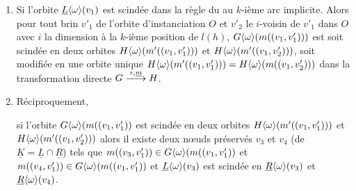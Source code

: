 \begin{proposition}
\begin{enumerate}
		\item Si l'orbite $\underline{L}\langle\omega\rangle(v_1)$ est scindée dans la règle du au $k$-ième arc implicite.
		      Alors pour tout brin $v'_1$ de l'orbite d'instanciation $O$ et $v'_2$ le $i$-voisin de $v'_1$ dans $O$ avec $i$ la dimension à la $k$-ième position de $l(h)$, $G\langle\omega\rangle(m((v_1,v'_1)))$ est soit scindée en deux orbites
		      $H\langle\omega\rangle(m'((v_1, v'_1)))$ et $H\langle\omega\rangle(m'((v_1,v'_2)))$, soit modifiée en une orbite unique $H\langle\omega\rangle(m'((v_1, v'_1))) = H\langle\omega\rangle(m((v_1,v'_2)))$ dans la transformation directe
		      $G \xlongrightarrow{r, \underline{m}} H$.

		\item Réciproquement,

		      si l'orbite $G\langle\omega\rangle(m((v_1, v'_1))$ est scindée en deux orbites
		      $H\langle\omega\rangle(m'((v_1, v'_1)))$ et $H\langle\omega\rangle(m'((v_1,v'_2)))$ alors il existe deux n\oe uds préservés $v_3$ et $v_4$ (de $\underline{K} = \underline{L} \cap \underline{R}$) tels que $m((v_3, v'_1)) \in G\langle\omega\rangle(m((v_1, v'_1))$ et $m((v_4, v'_1)) \in G\langle\omega\rangle(m((v_1, v'_1))$ et $\underline{L}\langle\omega\rangle(v_3)$ est scindée en $\underline{R}\langle\omega\rangle(v_3)$ et $\underline{R}\langle\omega\rangle(v_4)$. %

	\end{enumerate}

\end{proposition}

